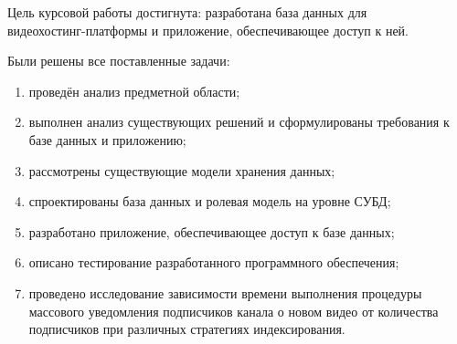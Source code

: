 
Цель курсовой работы достигнута: разработана база данных для \\ видеохостинг-платформы и приложение, обеспечивающее доступ к ней.

Были решены все поставленные задачи:
\begin{enumerate}
	\item проведён анализ предметной области;
	\item выполнен анализ существующих решений и сформулированы требования к базе данных и приложению;
	\item рассмотрены существующие модели хранения данных;
	\item спроектированы база данных и ролевая модель на уровне СУБД;
	\item разработано приложение, обеспечивающее доступ к базе данных;
	\item описано тестирование разработанного программного обеспечения;
	\item проведено исследование зависимости времени выполнения процедуры массового уведомления подписчиков канала о новом видео от количества подписчиков при различных стратегиях индексирования.
\end{enumerate}